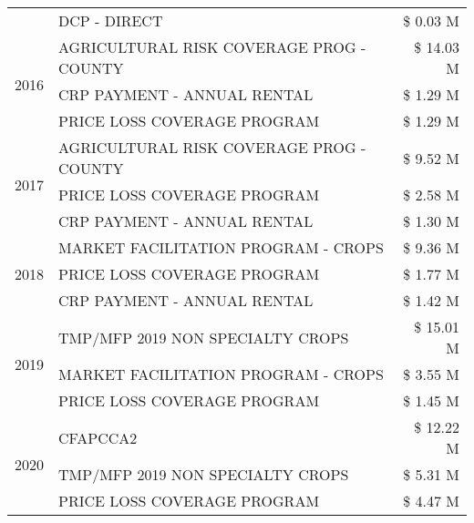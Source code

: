 \begin{tabular}{llr}
 & DCP - DIRECT & \$ 0.03 M \\
\cline{1-3}
\multirow[t]{3}{*}{2016} & AGRICULTURAL RISK COVERAGE PROG - COUNTY & \$ 14.03 M \\
 & CRP PAYMENT - ANNUAL RENTAL & \$ 1.29 M \\
 & PRICE LOSS COVERAGE PROGRAM & \$ 1.29 M \\
\cline{1-3}
\multirow[t]{3}{*}{2017} & AGRICULTURAL RISK COVERAGE PROG - COUNTY & \$ 9.52 M \\
 & PRICE LOSS COVERAGE PROGRAM & \$ 2.58 M \\
 & CRP PAYMENT - ANNUAL RENTAL & \$ 1.30 M \\
\cline{1-3}
\multirow[t]{3}{*}{2018} & MARKET FACILITATION PROGRAM - CROPS & \$ 9.36 M \\
 & PRICE LOSS COVERAGE PROGRAM & \$ 1.77 M \\
 & CRP PAYMENT - ANNUAL RENTAL & \$ 1.42 M \\
\cline{1-3}
\multirow[t]{3}{*}{2019} & TMP/MFP 2019 NON SPECIALTY CROPS & \$ 15.01 M \\
 & MARKET FACILITATION PROGRAM - CROPS & \$ 3.55 M \\
 & PRICE LOSS COVERAGE PROGRAM & \$ 1.45 M \\
\cline{1-3}
\multirow[t]{3}{*}{2020} & CFAPCCA2 & \$ 12.22 M \\
 & TMP/MFP 2019 NON SPECIALTY CROPS & \$ 5.31 M \\
 & PRICE LOSS COVERAGE PROGRAM & \$ 4.47 M \\
\cline{1-3}
\bottomrule
\end{tabular}
